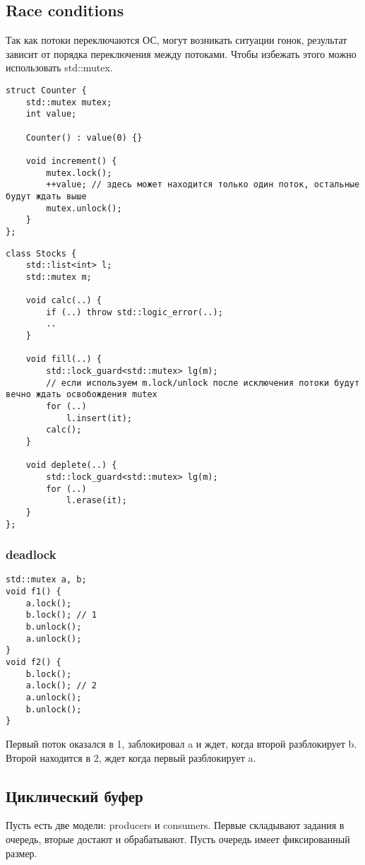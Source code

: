 \subsection{Race conditions}
Так как потоки переключаются ОС, могут возникать ситуации гонок, результат зависит от порядка переключения между потоками. Чтобы избежать этого можно использовать std::mutex.

\begin{verbatim}
struct Counter {
	std::mutex mutex;
	int value;

	Counter() : value(0) {}

	void increment() {
		mutex.lock();
		++value; // здесь может находится только один поток, остальные будут ждать выше
		mutex.unlock();
	}
};
\end{verbatim}

\begin{verbatim}
class Stocks {
	std::list<int> l;
	std::mutex m;

	void calc(..) {
		if (..) throw std::logic_error(..);
		..
	}

	void fill(..) {
		std::lock_guard<std::mutex> lg(m);
		// если используем m.lock/unlock после исключения потоки будут вечно ждать освобождения mutex
		for (..)
			l.insert(it); 
		calc();
	}

	void deplete(..) {
		std::lock_guard<std::mutex> lg(m);
		for (..) 
			l.erase(it);
	}
};
\end{verbatim}

\subsubsection{deadlock}
\begin{verbatim}
std::mutex a, b;
void f1() {
	a.lock();
	b.lock(); // 1
	b.unlock();
	a.unlock();
}
void f2() {
	b.lock();
	a.lock(); // 2
	a.unlock();
	b.unlock();
}
\end{verbatim}
Первый поток оказался в 1, заблокировал a и ждет, когда второй разблокирует b. Второй находится в 2, ждет когда первый разблокирует a. 

\subsection{Циклический буфер}
Пусть есть две модели: producers и consumers. Первые складывают задания в очередь, вторые достают и обрабатывают. Пусть очередь имеет фиксированный размер.

